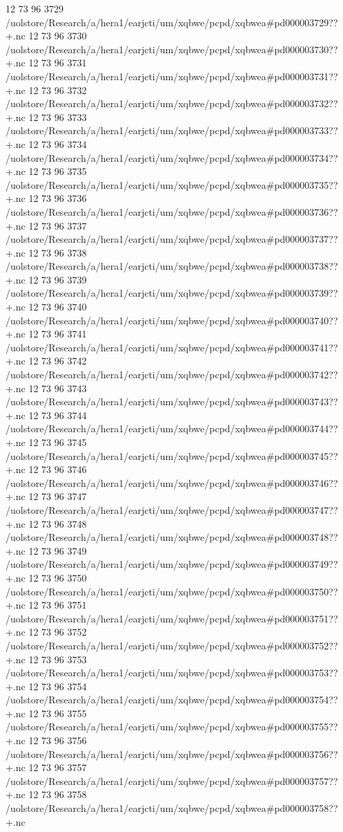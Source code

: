 12 73 96
3729
/uolstore/Research/a/hera1/earjcti/um/xqbwe/pcpd/xqbwea#pd000003729??+.nc
12 73 96
3730
/uolstore/Research/a/hera1/earjcti/um/xqbwe/pcpd/xqbwea#pd000003730??+.nc
12 73 96
3731
/uolstore/Research/a/hera1/earjcti/um/xqbwe/pcpd/xqbwea#pd000003731??+.nc
12 73 96
3732
/uolstore/Research/a/hera1/earjcti/um/xqbwe/pcpd/xqbwea#pd000003732??+.nc
12 73 96
3733
/uolstore/Research/a/hera1/earjcti/um/xqbwe/pcpd/xqbwea#pd000003733??+.nc
12 73 96
3734
/uolstore/Research/a/hera1/earjcti/um/xqbwe/pcpd/xqbwea#pd000003734??+.nc
12 73 96
3735
/uolstore/Research/a/hera1/earjcti/um/xqbwe/pcpd/xqbwea#pd000003735??+.nc
12 73 96
3736
/uolstore/Research/a/hera1/earjcti/um/xqbwe/pcpd/xqbwea#pd000003736??+.nc
12 73 96
3737
/uolstore/Research/a/hera1/earjcti/um/xqbwe/pcpd/xqbwea#pd000003737??+.nc
12 73 96
3738
/uolstore/Research/a/hera1/earjcti/um/xqbwe/pcpd/xqbwea#pd000003738??+.nc
12 73 96
3739
/uolstore/Research/a/hera1/earjcti/um/xqbwe/pcpd/xqbwea#pd000003739??+.nc
12 73 96
3740
/uolstore/Research/a/hera1/earjcti/um/xqbwe/pcpd/xqbwea#pd000003740??+.nc
12 73 96
3741
/uolstore/Research/a/hera1/earjcti/um/xqbwe/pcpd/xqbwea#pd000003741??+.nc
12 73 96
3742
/uolstore/Research/a/hera1/earjcti/um/xqbwe/pcpd/xqbwea#pd000003742??+.nc
12 73 96
3743
/uolstore/Research/a/hera1/earjcti/um/xqbwe/pcpd/xqbwea#pd000003743??+.nc
12 73 96
3744
/uolstore/Research/a/hera1/earjcti/um/xqbwe/pcpd/xqbwea#pd000003744??+.nc
12 73 96
3745
/uolstore/Research/a/hera1/earjcti/um/xqbwe/pcpd/xqbwea#pd000003745??+.nc
12 73 96
3746
/uolstore/Research/a/hera1/earjcti/um/xqbwe/pcpd/xqbwea#pd000003746??+.nc
12 73 96
3747
/uolstore/Research/a/hera1/earjcti/um/xqbwe/pcpd/xqbwea#pd000003747??+.nc
12 73 96
3748
/uolstore/Research/a/hera1/earjcti/um/xqbwe/pcpd/xqbwea#pd000003748??+.nc
12 73 96
3749
/uolstore/Research/a/hera1/earjcti/um/xqbwe/pcpd/xqbwea#pd000003749??+.nc
12 73 96
3750
/uolstore/Research/a/hera1/earjcti/um/xqbwe/pcpd/xqbwea#pd000003750??+.nc
12 73 96
3751
/uolstore/Research/a/hera1/earjcti/um/xqbwe/pcpd/xqbwea#pd000003751??+.nc
12 73 96
3752
/uolstore/Research/a/hera1/earjcti/um/xqbwe/pcpd/xqbwea#pd000003752??+.nc
12 73 96
3753
/uolstore/Research/a/hera1/earjcti/um/xqbwe/pcpd/xqbwea#pd000003753??+.nc
12 73 96
3754
/uolstore/Research/a/hera1/earjcti/um/xqbwe/pcpd/xqbwea#pd000003754??+.nc
12 73 96
3755
/uolstore/Research/a/hera1/earjcti/um/xqbwe/pcpd/xqbwea#pd000003755??+.nc
12 73 96
3756
/uolstore/Research/a/hera1/earjcti/um/xqbwe/pcpd/xqbwea#pd000003756??+.nc
12 73 96
3757
/uolstore/Research/a/hera1/earjcti/um/xqbwe/pcpd/xqbwea#pd000003757??+.nc
12 73 96
3758
/uolstore/Research/a/hera1/earjcti/um/xqbwe/pcpd/xqbwea#pd000003758??+.nc
